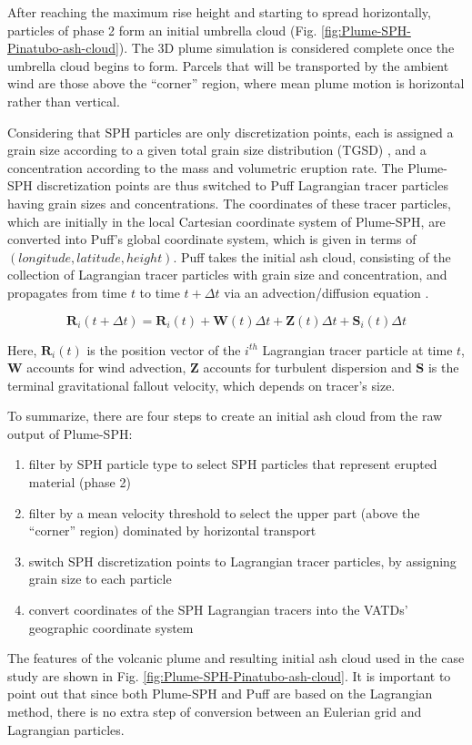 \documentclass[draft,linenumbers]{agujournal2019}
\begin{document}
After reaching the maximum rise height and starting to spread horizontally, particles of phase 2 form an initial umbrella cloud (Fig. \ref{fig:Plume-SPH-Pinatubo-ash-cloud}). The 3D plume simulation is considered complete once the umbrella cloud begins to form. Parcels that will be transported by the ambient wind are those above the ``corner'' region, where mean plume motion is horizontal rather than vertical.

Considering that SPH particles are only discretization points, each is assigned a grain size according to a given total grain size distribution (TGSD) \citep{paladio1996tephra}, and a concentration according to the mass and volumetric eruption rate. The Plume-SPH discretization points are thus switched to Puff Lagrangian tracer particles having grain sizes and concentrations. The coordinates of these tracer particles, which are initially in the local Cartesian coordinate system of Plume-SPH, are converted into Puff's global coordinate system, which is given in terms of $(longitude, latitude, height)$. Puff takes the initial ash cloud, consisting of the collection of Lagrangian tracer particles with grain size and concentration, and propagates from time $t$ to time $t+\Delta t$ via an advection/diffusion equation \citep{searcy1998puff}.
\begin{linenomath*}
\begin{equation}
\textbf{R}_i(t+\Delta t) = \textbf{R}_i(t) + \textbf{W}(t)\Delta t + \textbf{Z}(t)\Delta t + \textbf{S}_i(t) \Delta t
\end{equation}
\end{linenomath*}
Here, $\textbf{R}_i(t)$ is the position vector of the $i^{th}$ Lagrangian tracer particle at time $t$, $\textbf{W}$ accounts for wind advection, $\textbf{Z}$ accounts for turbulent dispersion and $\textbf{S}$ is the terminal gravitational fallout velocity, which depends on tracer's size.

To summarize, there are four steps to create an initial ash cloud from the raw output of Plume-SPH:
\begin{enumerate}
\item filter by SPH particle type to select SPH particles that represent erupted material (phase 2)
\item filter by a mean velocity threshold to select the upper part (above the ``corner'' region) dominated by horizontal transport
\item switch SPH discretization points to Lagrangian tracer particles, by assigning grain size to each particle
\item convert coordinates of the SPH Lagrangian tracers into the VATDs' geographic coordinate system
\end{enumerate}
The features of the volcanic plume and resulting initial ash cloud used in the case study are shown in Fig. \ref{fig:Plume-SPH-Pinatubo-ash-cloud}. It is important to point out that since both Plume-SPH and Puff are based on the Lagrangian method, there is no extra step of conversion between an Eulerian grid and Lagrangian particles.
\end{document}
